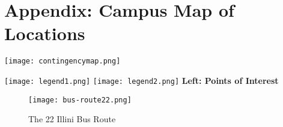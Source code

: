 \section{Appendix: Campus Map of Locations}

\begin{minipage}{0.5\textwidth}
		\texttt{[image: contingencymap.png]}
\end{minipage}
\begin{minipage}{0.5\textwidth}

		\texttt{[image: legend1.png]}
		\vspace{0.5cm}
		\hspace{0.26cm}
		\texttt{[image: legend2.png]}
		\vspace{1cm}
		\hspace{2.25cm}
		\large\textbf{Left: Points of Interest}
\end{minipage}




\begin{figure}[H]
	\centering
	\texttt{[image: bus-route22.png]}
	\caption{The 22 Illini Bus Route}
\end{figure}